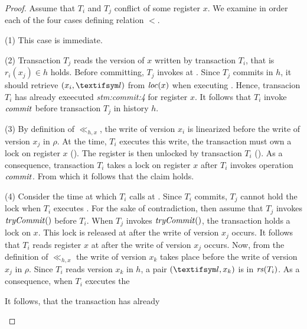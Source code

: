 \begin{proof}
  Assume that $T_i$ and $T_j$ conflict of some register $x$.
  We examine in order each of the four cases defining relation $<$.
  \begin{compactitem}
  \item[(1)]
    This case is immediate.
  \item[(2)]
    Transaction $T_j$ reads the version of $x$ written by transaction $T_i$, that is $r_i(x_j) \in h$ holds.
    Before committing, $T_j$ invokes \stmExtendFunction at .
    Since $T_j$ commits in $h$, it should retrieve $(x_i,\msgAny)$ from $\locationOf{x}$ when executing .
    Hence, transacion $T_i$ has already exeecuted \emph{stm:commit:4} for register $x$.
    It follows that $T_i$ invoke $\stmCommitFunction$ before transaction $T_j$ in history $h$.
  \item[(3)]
    By definition of $\ll_{h,x}$, the write of version $x_i$ is linearized before the write of version $x_j$ in $\rho$.
    At the time, $T_i$ executes this write, the transaction must own a lock on register $x$ ().
    The register is then unlocked by transaction $T_i$ ().
    As a consequence, transaction $T_i$ takes a lock on register $x$ after $T_i$ invokes operation $\stmCommitFunction$.
    From which it follows that the claim holds.
  \item[(4)]
    Consider the time at which $T_i$ calls \stmExtendFunction at .
    Since $T_i$ commits, $T_j$ cannot hold the lock when $T_i$ executes .
    For the sake of contradiction, then assume that $T_j$ invokes $\stmTryCommit$ before $T_i$.
    When $T_j$ invokes $\stmTryCommit$, the transaction holds a lock on $x$.
    This lock is released at  after the write of version $x_j$ occurs.    
    It follows that $T_i $ reads register $x$ at  after the write of version $x_j$ occurs.
    Now, from the definition of $\ll_{h,x}$ the write of version $x_k$ takes place before the write of version $x_j$ in $\rho$.
    Since $T_i$ reads version $x_k$ in $h$, a pair $(\msgAny,x_k)$ is in $\readSetOf{T_i}$.    
    As a consequence, when $T_i$ executes  the 
    
    
    
    It follows, that the transaction has already 
    
  \end{compactitem}
  
\end{proof}


